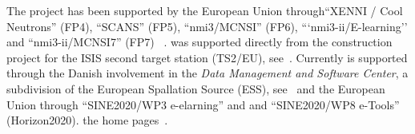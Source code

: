 The \MCS project has been supported by the European Union
through``XENNI / Cool Neutrons'' (FP4), ``SCANS'' (FP5),
``nmi3/MCNSI'' (FP6), ```nmi3-ii/E-learning'' and ``nmi3-ii/MCNSI7''
(FP7) ~\cite{nmi3_webpage,mcnsi_webpage}.
\MCS was supported directly from the construction project for the ISIS second
target station (TS2/EU), see~\cite{ts2_webpage}. Currently \MCS is 
supported through the Danish involvement in the \emph{Data Management
  and Software Center}, a subdivision of the 
European Spallation Source (ESS), see~\cite{ess_webpage} and the
European Union through ``SINE2020/WP3 e-elarning''
and and ``SINE2020/WP8 e-Tools'' (Horizon2020).
the home pages~\cite{sine_webpage}.

